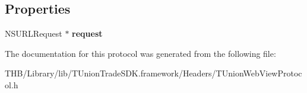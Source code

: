 \subsection*{Properties}
\begin{DoxyCompactItemize}
\item 
\mbox{\label{protocol_t_union_web_view_protocol_01-p_abdab9f2c20d363de60ccc864b0b60b24}} 
N\+S\+U\+R\+L\+Request $\ast$ {\bfseries request}
\end{DoxyCompactItemize}


The documentation for this protocol was generated from the following file\+:\begin{DoxyCompactItemize}
\item 
T\+H\+B/\+Library/lib/\+T\+Union\+Trade\+S\+D\+K.\+framework/\+Headers/T\+Union\+Web\+View\+Protocol.\+h\end{DoxyCompactItemize}
